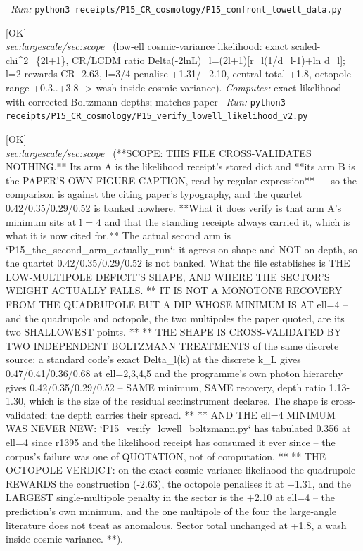 \begin{description}
\ \emph{Run:} \texttt{python3 receipts/P15\_CR\_cosmology/P15\_confront\_lowell\_data.py}
\item[\rcptlabel{P15_verify_lowell_likelihood_v2}{P15R33}\textbf{P15R33}\quad\texttt{P15\_verify\_lowell\_likelihood\_v2}]\hfill\textsf{[OK]}\\
\textit{sec:largescale/sec:scope} \ (low-ell cosmic-variance likelihood: exact scaled-chi\textasciicircum{}2\_\{2l+1\}, CR/LCDM ratio Delta(-2lnL)\_l=(2l+1)[r\_l(1/d\_l-1)+ln d\_l]; l=2 rewards CR -2.63, l=3/4 penalise +1.31/+2.10, central total +1.8, octopole range +0.3..+3.8 -> wash inside cosmic variance). 
\emph{Computes:} exact likelihood with corrected Boltzmann depths; matches paper
\ \emph{Run:} \texttt{python3 receipts/P15\_CR\_cosmology/P15\_verify\_lowell\_likelihood\_v2.py}
\item[\rcptlabel{P15_the_low_ell_minimum_is_at_ell_four}{P15R34}\textbf{P15R34}\quad\texttt{P15\_the\_low\_ell\_minimum\_is\_at\_ell\_four}]\hfill\textsf{[OK]}\\
\textit{sec:largescale/sec:scope} \ (**SCOPE: THIS FILE CROSS-VALIDATES NOTHING.** Its arm A is the likelihood receipt's stored dict and **its arm B is the PAPER'S OWN FIGURE CAPTION, read by regular expression** --- so the comparison is against the citing paper's typography, and the quartet 0.42/0.35/0.29/0.52 is banked nowhere. **What it does verify is that arm A's minimum sits at l = 4 and that the standing receipts always carried it, which is what it is now cited for.** The actual second arm is `P15\_the\_second\_arm\_actually\_run`: it agrees on shape and NOT on depth, so the quartet 0.42/0.35/0.29/0.52 is not banked. What the file establishes is THE LOW-MULTIPOLE DEFICIT'S SHAPE, AND WHERE THE SECTOR'S WEIGHT ACTUALLY FALLS. ** IT IS NOT A MONOTONE RECOVERY FROM THE QUADRUPOLE BUT A DIP WHOSE MINIMUM IS AT ell=4 -- and the quadrupole and octopole, the two multipoles the paper quoted, are its two SHALLOWEST points. ** ** THE SHAPE IS CROSS-VALIDATED BY TWO INDEPENDENT BOLTZMANN TREATMENTS of the same discrete source: a standard code's exact Delta\_l(k) at the discrete k\_L gives 0.47/0.41/0.36/0.68 at ell=2,3,4,5 and the programme's own photon hierarchy gives 0.42/0.35/0.29/0.52 -- SAME minimum, SAME recovery, depth ratio 1.13-1.30, which is the size of the residual sec:instrument declares. The shape is cross-validated; the depth carries their spread. ** ** AND THE ell=4 MINIMUM WAS NEVER NEW: `P15\_verify\_lowell\_boltzmann.py` has tabulated 0.356 at ell=4 since r1395 and the likelihood receipt has consumed it ever since -- the corpus's failure was one of QUOTATION, not of computation. ** ** THE OCTOPOLE VERDICT: on the exact cosmic-variance likelihood the quadrupole REWARDS the construction (-2.63), the octopole penalises it at +1.31, and the LARGEST single-multipole penalty in the sector is the +2.10 at ell=4 -- the prediction's own minimum, and the one multipole of the four the large-angle literature does not treat as anomalous. Sector total unchanged at +1.8, a wash inside cosmic variance. **). 

\end{description}
